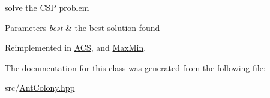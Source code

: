 solve the C\+SP problem 


\begin{DoxyParams}{Parameters}
{\em best} & the best solution found \\
\hline
\end{DoxyParams}


Reimplemented in \hyperlink{classACS_a6629ce98a1027c8d548357c068291f7a}{A\+CS}, and \hyperlink{classMaxMin_a27fd649b6f2efc343293d759ee6b5e9d}{Max\+Min}.



The documentation for this class was generated from the following file\+:\begin{DoxyCompactItemize}
\item 
src/\hyperlink{AntColony_8hpp}{Ant\+Colony.\+hpp}\end{DoxyCompactItemize}
